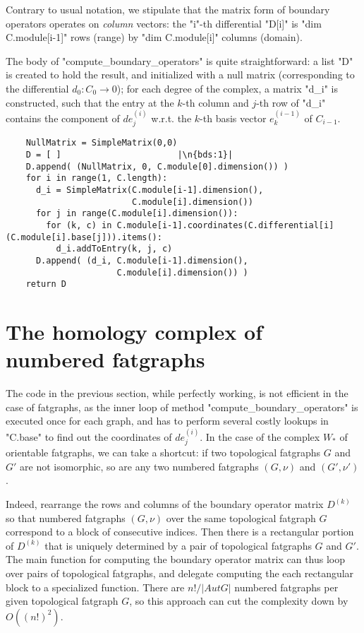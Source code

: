 Contrary to usual notation, we stipulate that the matrix form of
boundary operators operates on \emph{column} vectors: the "i"-th
differential "D[i]" is "dim C.module[i-1]" rows (range) by 
"dim C.module[i]" columns (domain).

The body of "compute_boundary_operators" is quite straightforward: a
list "D" is created to hold the result, and initialized with a null
matrix (corresponding to the differential $d_0: C_0 \to 0$); for each
degree of the complex, a matrix "d_i" is constructed, such that the
entry at the $k$-th column and $j$-th row of "d_i" contains the
component of $de^{(i)}_j$ w.r.t. the $k$-th basis vector $e^{(i-1)}_k$
of $C_{i-1}$.
\begin{lstlisting}
    NullMatrix = SimpleMatrix(0,0)
    D = [ ]                       |\n{bds:1}|
    D.append( (NullMatrix, 0, C.module[0].dimension()) )
    for i in range(1, C.length):
      d_i = SimpleMatrix(C.module[i-1].dimension(),
                         C.module[i].dimension())
      for j in range(C.module[i].dimension()):
        for (k, c) in C.module[i-1].coordinates(C.differential[i](C.module[i].base[j])).items():
          d_i.addToEntry(k, j, c)
      D.append( (d_i, C.module[i-1].dimension(), 
                      C.module[i].dimension()) )
    return D

\end{lstlisting}


\section{The homology complex of numbered fatgraphs}
\label{sec:homology-numbered-fatgraphs}

The code in the previous section, while perfectly working, is not
efficient in the case of fatgraphs, as the inner loop of method
"compute_boundary_operators" is executed once for each graph, and has
to perform several costly lookups in "C.base" to find out the
coordinates of $de^{(i)}_j$.  In the case of the complex $W_*$
of orientable fatgraphs, we can take a shortcut: if two topological
fatgraphs $G$ and $G'$ are not isomorphic, so are any two numbered
fatgraphs $(G,\nu)$ and $(G',\nu')$.  

Indeed, rearrange the rows and columns of the boundary operator matrix
$D^{(k)}$ so that numbered fatgraphs $(G,\nu)$ over the same
topological fatgraph $G$ correspond to a block of consecutive
indices. Then there is a rectangular portion of $D^{(k)}$ that is
uniquely determined by a pair of topological fatgraphs $G$ and $G'$.
The main function for computing the boundary operator matrix can thus loop
over pairs of topological fatgraphs, and delegate computing the each
rectangular block to a specialized function.  There are $n! / |Aut G|$
numbered fatgraphs per given topological fatgraph $G$, so this
approach can cut the complexity down by $O((n!)^2)$.

